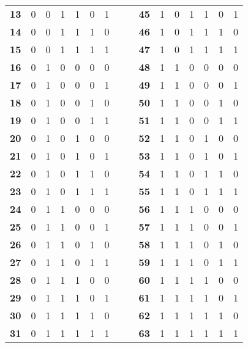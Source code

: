 \documentclass[a4paper,11pt]{report}
\begin{document}
\begin{samepage}
{\begin{tabular}{ @{} c c c c c c c l l c c c c c c c @{} }
  \textbf{13} & 0 & 0 & 1 & 1 & 0 & 1 &  &  & \textbf{45} & 1 & 0 & 1 & 1 & 0 & 1 \\ 
  \textbf{14} & 0 & 0 & 1 & 1 & 1 & 0 &  &  & \textbf{46} & 1 & 0 & 1 & 1 & 1 & 0 \\ 
  \textbf{15} & 0 & 0 & 1 & 1 & 1 & 1 &  &  & \textbf{47} & 1 & 0 & 1 & 1 & 1 & 1 \\ 
  \textbf{16} & 0 & 1 & 0 & 0 & 0 & 0 &  &  & \textbf{48} & 1 & 1 & 0 & 0 & 0 & 0 \\ 
  \textbf{17} & 0 & 1 & 0 & 0 & 0 & 1 &  &  & \textbf{49} & 1 & 1 & 0 & 0 & 0 & 1 \\ 
  \textbf{18} & 0 & 1 & 0 & 0 & 1 & 0 &  &  & \textbf{50} & 1 & 1 & 0 & 0 & 1 & 0 \\ 
  \textbf{19} & 0 & 1 & 0 & 0 & 1 & 1 &  &  & \textbf{51} & 1 & 1 & 0 & 0 & 1 & 1 \\ 
  \textbf{20} & 0 & 1 & 0 & 1 & 0 & 0 &  &  & \textbf{52} & 1 & 1 & 0 & 1 & 0 & 0 \\ 
  \textbf{21} & 0 & 1 & 0 & 1 & 0 & 1 &  &  & \textbf{53} & 1 & 1 & 0 & 1 & 0 & 1 \\ 
  \textbf{22} & 0 & 1 & 0 & 1 & 1 & 0 &  &  & \textbf{54} & 1 & 1 & 0 & 1 & 1 & 0 \\ 
  \textbf{23} & 0 & 1 & 0 & 1 & 1 & 1 &  &  & \textbf{55} & 1 & 1 & 0 & 1 & 1 & 1 \\ 
  \textbf{24} & 0 & 1 & 1 & 0 & 0 & 0 &  &  & \textbf{56} & 1 & 1 & 1 & 0 & 0 & 0 \\ 
  \textbf{25} & 0 & 1 & 1 & 0 & 0 & 1 &  &  & \textbf{57} & 1 & 1 & 1 & 0 & 0 & 1 \\ 
  \textbf{26} & 0 & 1 & 1 & 0 & 1 & 0 &  &  & \textbf{58} & 1 & 1 & 1 & 0 & 1 & 0 \\ 
  \textbf{27} & 0 & 1 & 1 & 0 & 1 & 1 &  &  & \textbf{59} & 1 & 1 & 1 & 0 & 1 & 1 \\ 
  \textbf{28} & 0 & 1 & 1 & 1 & 0 & 0 &  &  & \textbf{60} & 1 & 1 & 1 & 1 & 0 & 0 \\ 
  \textbf{29} & 0 & 1 & 1 & 1 & 0 & 1 &  &  & \textbf{61} & 1 & 1 & 1 & 1 & 0 & 1 \\ 
  \textbf{30} & 0 & 1 & 1 & 1 & 1 & 0 &  &  & \textbf{62} & 1 & 1 & 1 & 1 & 1 & 0 \\ 
  \textbf{31} & 0 & 1 & 1 & 1 & 1 & 1 &  &  & \textbf{63} & 1 & 1 & 1 & 1 & 1 & 1
\end{tabular}

\par}


\end{samepage}
\end{document}
